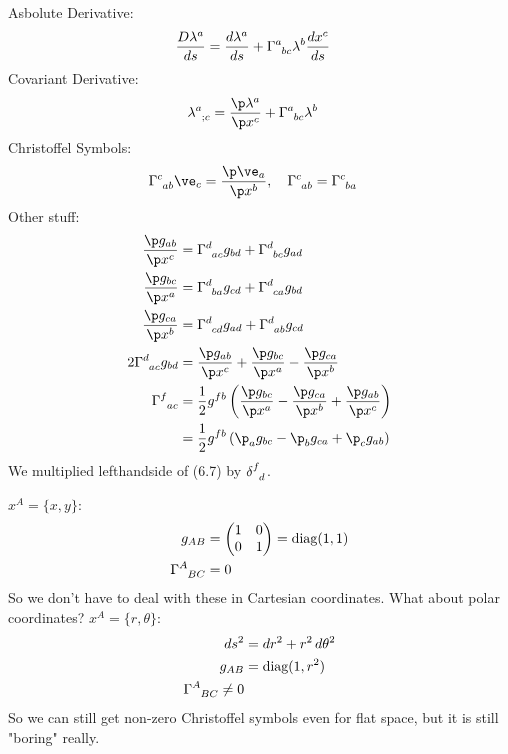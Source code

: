 \documentclass[a4paper, 11pt, normalem]{report}
\begin{document}
\chapter{}
Asbolute Derivative:
\begin{align}
    \frac{D\lambda^a}{ds} &= \frac{d\lambda^a}{ds} + \tensor{\Gamma}{^a_{bc}}\lambda^b\frac{dx^c}{ds}
\end{align}
Covariant Derivative:
\begin{align}
    \tensor{\lambda}{^a_{;c}} &= \frac{\p\lambda^a}{\p x^c}+\tensor{\Gamma}{^a_{bc}}\lambda^b
\end{align}
Christoffel Symbols:
\begin{align}
    \tensor{\Gamma}{^c_{ab}}\ve_c &= \frac{\p\ve_a}{\p x^b},\quad \tensor{\Gamma}{^c_{ab}} = \tensor{\Gamma}{^c_{ba}}
\end{align}
Other stuff:
\begin{align}
    \frac{\p g_{ab}}{\p x^c} &= \tensor{\Gamma}{^d_{ac}}g_{bd} + \tensor{\Gamma}{^d_{bc}}g_{ad}\\
    \frac{\p g_{bc}}{\p x^a} &= \tensor{\Gamma}{^d_{ba}}g_{cd} + \tensor{\Gamma}{^d_{ca}}g_{bd}\\
    \frac{\p g_{ca}}{\p x^b} &= \tensor{\Gamma}{^d_{cd}}g_{ad} + \tensor{\Gamma}{^d_{ab}}g_{cd}\\
    2\tensor{\Gamma}{^d_{ac}}g_{bd} &= \frac{\p g_{ab}}{\p x^c} + \frac{\p g_{bc}}{\p x^a} - \frac{\p g_{ca}}{\p x^b} \\
    \tensor{\Gamma}{^f_{ac}} &= \frac12 g^{fb}\left(\frac{\p g_{bc}}{\p x^a} - \frac{\p g_{ca}}{\p x^b} + \frac{\p g_{ab}}{\p x^c}\right) \\
                             &= \frac12 g^{fb}\left(\p_a g_{bc} - \p_b g_{ca} + \p_c g_{ab}\right)
\end{align}
We multiplied lefthandside of (6.7) by $\tensor{\delta}{^f_d}$.

\begin{example}
    $x^A = \{x,y\}$:
    \begin{align}
        g_{AB} &= \begin{pmatrix} 1 & 0 \\ 0 & 1 \end{pmatrix} = \text{diag}(1,1) \\
        \tensor{\Gamma}{^A_{BC}} &= 0 
    \end{align}
    So we don't have to deal with these in Cartesian coordinates. What about polar coordinates? $x^A = \{r,\theta\}$:
    \begin{align}
        ds^2 &= dr^2 + r^2\,d\theta^2 \\
        g_{AB} &= \text{diag}(1,r^2) \\
        \tensor{\Gamma}{^A_{BC}} \neq 0 
    \end{align}
    So we can still get non-zero Christoffel symbols even for flat space, but it is still "boring" really. 
\end{example}
\end{document}
